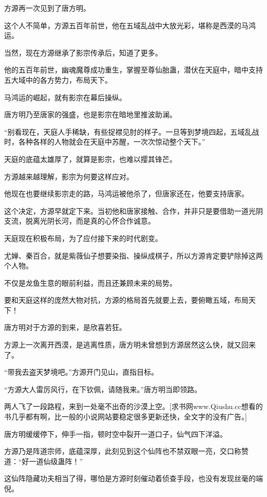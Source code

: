 
\begin{this_body}

方源再一次见到了唐方明。

这个人不简单，方源五百年前世，他在五域乱战中大放光彩，堪称是西漠的马鸿运。

当然，现在方源继承了影宗传承后，知道了更多。

他的五百年前世，幽魂魔尊成功重生，掌握至尊仙胎蛊，潜伏在天庭中，暗中支持五大域中的各方势力，布局天下。

马鸿运的崛起，就有影宗在幕后操纵。

唐方明乃至唐家的强盛，也是影宗在暗地里推波助澜。

“别看现在，天庭人手稀缺，有些捉襟见肘的样子。一旦等到梦境四起，五域乱战时，各种各样的人物就会在天庭中苏醒，一次次惊动整个天下。”

天庭的底蕴太雄厚了，就算是影宗，也难以撄其锋芒。

方源越来越理解，影宗为何要这样应对。

他现在也要继续影宗走的路，马鸿运被他杀了，但唐家还在，他要支持唐家。

这个决定，方源早就定下来。当初他和唐家接触、合作，并非只是要借助一道光阴支流，脱离光阴长河，而是真的心怀合作诚意。

天庭现在积极布局，为了应付接下来的时代剧变。

尤婵、秦百合，就是紫薇仙子想要染指、操纵成棋子，所以方源肯定要铲除掉这两个人物。

不仅是龙鱼生意的眼前利益，而且还兼顾未来的局势。

要和天庭这样的庞然大物对抗，方源的格局首先就要上去，要俯瞰五域，布局天下！

唐方明对于方源的到来，是欣喜若狂。

方源上一次离开西漠，是逃离性质，唐方明未曾想到方源居然这么快，就又回来了。

“带我去盗天梦境吧。”方源开门见山，直指目标。

“方源大人雷厉风行，在下钦佩，请随我来。”唐方明当即领路。

两人飞了一段路程，来到一处毫不出奇的沙漠上空。[求书网www.Qiushu.cc想看的书几乎都有啊，比一般的小说网站要稳定很多更新还快，全文字的没有广告。]

唐方明缓缓停下，伸手一指，顿时空中裂开一道口子，仙气四下洋溢。

方源乃是阵道宗师，底蕴深厚，此刻见到这个仙阵也不禁双眼一亮，交口称赞道：“好一道仙级蛊阵！”

这仙阵隐藏功夫相当了得，哪怕是方源时刻催动着侦查手段，也没有发现丝毫的端倪。


\end{this_body}
